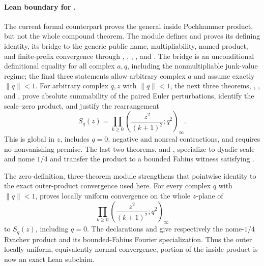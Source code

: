 \documentclass[11pt,a4paper,oneside,openany]{book}
\theoremstyle{definition}
\theoremstyle{remark}
\begin{document}
\paragraph{Lean boundary for .}
The current formal counterpart proves the general inside Pochhammer product,
but not the whole compound theorem.  The module
 defines
 and proves its defining identity, its bridge to
the generic public name, multipliability, named product, and finite-prefix
convergence through
,
,
,
, and
.  The bridge is an unconditional
definitional equality for all complex $a,q$, including the nonmultipliable
junk-value regime; the final three statements allow arbitrary complex $a$
and assume exactly $\lVert q\rVert<1$.
For arbitrary complex $q,z$ with $\lVert q\rVert<1$, the next three theorems,
,
, and
, prove absolute
summability of the paired Euler perturbations, identify the scale--zero
product, and justify the rearrangement
\[
 S_q(z)=\prod_{k\ge0}
 \left(\frac{z^2}{(k+1)^2};q^2\right)_{\!\infty}.
\]
This is global in $z$, includes $q=0$, negative and nonreal contractions, and
requires no nonvanishing premise.  The last two theorems,
 and
, specialize to dyadic
scale and nome $1/4$ and transfer the product to a bounded Fabius witness
satisfying .

The zero-definition, three-theorem module
 strengthens that pointwise
identity to the exact outer-product convergence used here.  For every complex
$q$ with $\lVert q\rVert<1$,
proves locally uniform convergence on the whole $z$-plane of
\[
 \prod_{k\ge0}
 \left(\frac{z^2}{(k+1)^2};q^2\right)_\infty
\]
to $S_q(z)$, including $q=0$.  The declarations
and
give respectively the nome-$1/4$ Rvachev product and its bounded-Fabius
Fourier specialization.  Thus the outer locally-uniform, equivalently normal
convergence, portion of the inside product is now an exact Lean subclaim.
\end{document}
